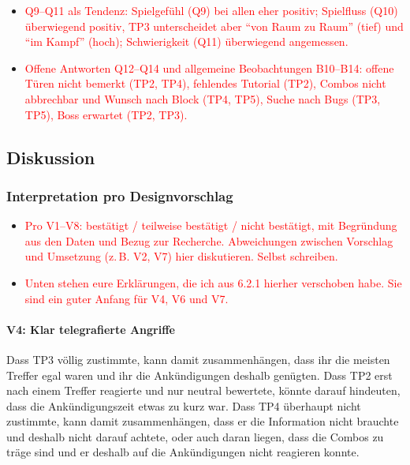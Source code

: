 \documentclass[../Main.tex]{subfiles}
\begin{document}
\begin{itemize}[leftmargin=1.5cm]
    \item \textcolor{red}{Q9--Q11 als Tendenz: Spielgefühl (Q9) bei allen eher positiv; Spielfluss (Q10) überwiegend positiv, TP3 unterscheidet aber \enquote{von Raum zu Raum} (tief) und \enquote{im Kampf} (hoch); Schwierigkeit (Q11) überwiegend angemessen.}
    \item \textcolor{red}{Offene Antworten Q12--Q14 und allgemeine Beobachtungen B10--B14: offene Türen nicht bemerkt (TP2, TP4), fehlendes Tutorial (TP2), Combos nicht abbrechbar und Wunsch nach Block (TP4, TP5), Suche nach Bugs (TP3, TP5), Boss erwartet (TP2, TP3).}
\end{itemize}

\subsection{Diskussion}

\subsubsection{Interpretation pro Designvorschlag} \label{sec:Interpretation}

\begin{itemize}[leftmargin=1.5cm]
    \item \textcolor{red}{Pro V1--V8: bestätigt / teilweise bestätigt / nicht bestätigt, mit Begründung aus den Daten und Bezug zur Recherche. Abweichungen zwischen Vorschlag und Umsetzung (z.\,B. V2, V7) hier diskutieren. Selbst schreiben.}
    \item \textcolor{red}{Unten stehen eure Erklärungen, die ich aus 6.2.1 hierher verschoben habe. Sie sind ein guter Anfang für V4, V6 und V7.}
\end{itemize}

\paragraph{V4: Klar telegrafierte Angriffe}
Dass TP3 völlig zustimmte, kann damit zusammenhängen, dass ihr die meisten Treffer egal waren und ihr die Ankündigungen deshalb genügten. Dass TP2 erst nach einem Treffer reagierte und nur neutral bewertete, könnte darauf hindeuten, dass die Ankündigungszeit etwas zu kurz war. Dass TP4 überhaupt nicht zustimmte, kann damit zusammenhängen, dass er die Information nicht brauchte und deshalb nicht darauf achtete, oder auch daran liegen, dass die Combos zu träge sind und er deshalb auf die Ankündigungen nicht reagieren konnte.
\end{document}

